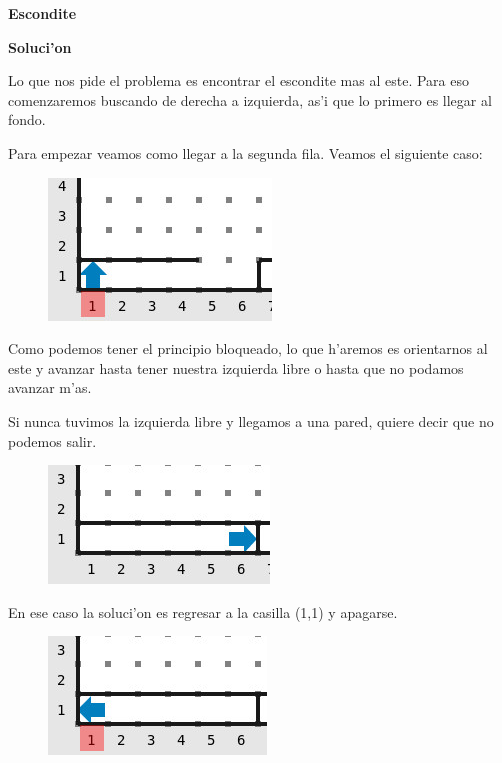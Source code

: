 \documentclass{article}
\begin{document}
    \begin{center}
    	\huge \textbf{Escondite}
    \end{center}
    
    \hfill \break
    \large{ \textbf{Soluci'on}}

    \hfill \break
    Lo que nos pide el problema es encontrar el escondite mas al este. Para eso comenzaremos buscando
    de derecha a izquierda, as'i que lo primero es llegar al fondo. 

    Para empezar veamos como llegar a la segunda fila. Veamos el siguiente caso:

    \begin{figure}[h]
        \centering
        \includegraphics[scale=0.5]{primer_bloqueado}
    \end{figure}

    Como podemos tener el principio bloqueado, lo que h'aremos es orientarnos al este y avanzar hasta
    tener nuestra izquierda libre o hasta que no podamos avanzar m'as.

    Si nunca tuvimos la izquierda libre y llegamos a una pared, quiere decir que no podemos salir.

    \begin{figure}[h]
        \centering
        \includegraphics[scale=0.5]{imposible_salir}
    \end{figure}

    En ese caso la soluci'on es regresar a la casilla (1,1) y apagarse.

    \begin{figure}[h]
        \centering
        \includegraphics[scale=0.5]{regresando_a_1_1}
    \end{figure}
\end{document}
